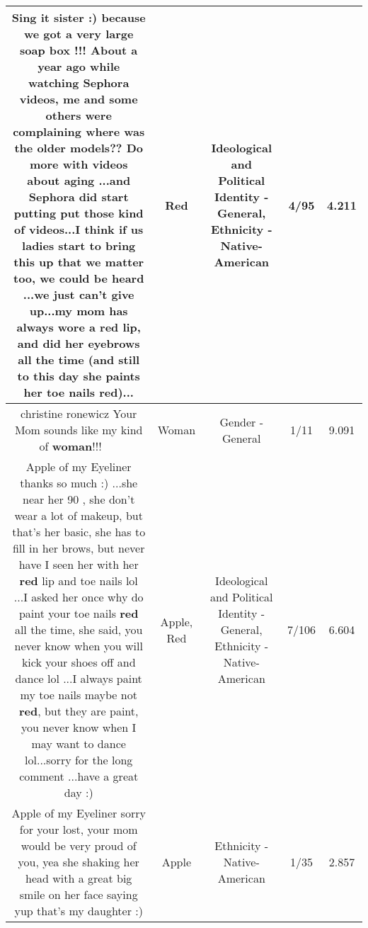 \documentclass[11pt]{article}
\newlength\mylength
\begin{document}
\begin{center}
\begin{longtable}{|C{.65\mylength}|C{.30\mylength}|C{.12\mylength}|C{.12\mylength}|C{.12\mylength}|}
  \small Sing it sister :) because we got a very large soap box !!! About a year ago while watching Sephora videos, me and some others were complaining where was the older models?? Do more with videos about aging ...and Sephora did start putting put those kind of videos...I think if us ladies start to bring this up that we matter too, we could be heard ...we just can't give up...my mom has always wore a \textbf{r\textbf{ed}} lip, and did her eyebrows all the time (and still to this day she paints her toe nails \textbf{r\textbf{ed}})...\normalsize   & Red &  Ideological and Political Identity - General, Ethnicity - Native-American & 4/95 & 4.211 \\  \hline
  \small christine ronewicz Your Mom sounds like my kind of \textbf{woman}!!! 👍🏽👍🏽\normalsize   & Woman & Gender - General & 1/11 & 9.091 \\  \hline
  \small Apple of my Eyeliner thanks so much :) ...she near her 90 , she don't wear a lot of makeup,  but that's her basic, she has to fill in her brows, but never have I seen her with her \textbf{r\textbf{ed}} lip and toe nails lol ...I asked her once why do paint your toe nails \textbf{r\textbf{ed}} all the time, she said, you never know when you will kick your shoes off and dance lol ...I always paint my toe nails maybe not \textbf{r\textbf{ed}}, but they are paint, you never know when I may want to dance lol...sorry for the long comment ...have a great day :)\normalsize   & Apple, Red &  Ideological and Political Identity - General, Ethnicity - Native-American & 7/106 & 6.604 \\  \hline
  \small Apple of my Eyeliner sorry for your lost, your mom would be very proud of you,  yea she shaking her head with a great big smile on her face saying yup that's my daughter :)\normalsize   & Apple & Ethnicity - Native-American & 1/35 & 2.857 \\  \hline

\end{longtable}
\end{center}
\end{document}
